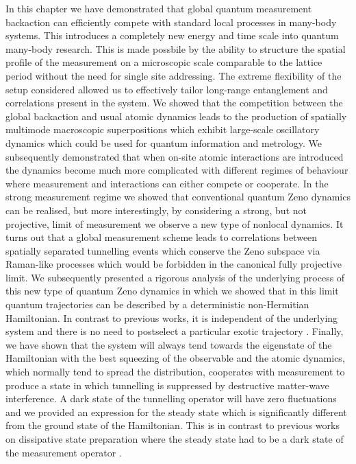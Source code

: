 In this chapter we have demonstrated that global quantum measurement
backaction can efficiently compete with standard local processes in
many-body systems. This introduces a completely new energy and time
scale into quantum many-body research. This is made possbile by the
ability to structure the spatial profile of the measurement on a
microscopic scale comparable to the lattice period without the need
for single site addressing. The extreme flexibility of the setup
considered allowed us to effectively tailor long-range entanglement
and correlations present in the system. We showed that the competition
between the global backaction and usual atomic dynamics leads to the
production of spatially multimode macroscopic superpositions which
exhibit large-scale oscillatory dynamics which could be used for
quantum information and metrology. We subsequently demonstrated that
when on-site atomic interactions are introduced the dynamics become
much more complicated with different regimes of behaviour where
measurement and interactions can either compete or cooperate. In the
strong measurement regime we showed that conventional quantum Zeno
dynamics can be realised, but more interestingly, by considering a
strong, but not projective, limit of measurement we observe a new type
of nonlocal dynamics. It turns out that a global measurement scheme
leads to correlations between spatially separated tunnelling events
which conserve the Zeno subspace via Raman-like processes which would
be forbidden in the canonical fully projective limit. We subsequently
presented a rigorous analysis of the underlying process of this new
type of quantum Zeno dynamics in which we showed that in this limit
quantum trajectories can be described by a deterministic non-Hermitian
Hamiltonian. In contrast to previous works, it is independent of the
underlying system and there is no need to postselect a particular
exotic trajectory \cite{lee2014prx, lee2014prl}. Finally, we have
shown that the system will always tend towards the eigenstate of the
Hamiltonian with the best squeezing of the observable and the atomic
dynamics, which normally tend to spread the distribution, cooperates
with measurement to produce a state in which tunnelling is suppressed
by destructive matter-wave interference. A dark state of the
tunnelling operator will have zero fluctuations and we provided an
expression for the steady state which is significantly different from
the ground state of the Hamiltonian. This is in contrast to previous
works on dissipative state preparation where the steady state had to
be a dark state of the measurement operator \cite{diehl2008}.

